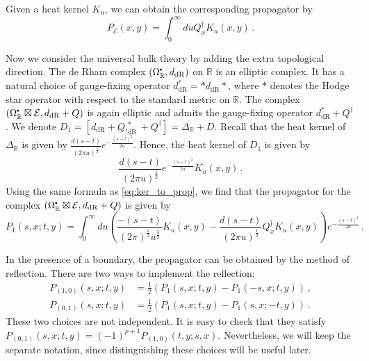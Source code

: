\documentclass[11pt]{article}
\newcommand{\R}{\mathbb{R}}
\newcommand{\derham}{\mathrm{dR}}
\newcommand\sbullet[1][.5]{\mathbin{\vcenter{\hbox{\scalebox{#1}{$\bullet$}}}}}
\numberwithin{equation}{section}
\begin{document}
Given a heat kernel $K_u$, we can obtain the corresponding propagator by
\begin{equation}\label{eq:ker_to_prop}
	P_{\mathcal{E}}(x,y) = \int_0^\infty du Q_x^{\dagger}K_u(x,y)\,.
\end{equation}

Now we consider the universal bulk theory by adding the extra topological direction. The de Rham complex $(\Omega^{\sbullet}_{\R},d_{\derham})$ on $\R$ is an elliptic complex. It has a natural choice of gauge-fixing operator $d_{\mathrm{dR}}^* = * d_{\mathrm{dR}}*$, where $*$ denotes the Hodge star operator with respect to the standard metric on $\R$. The complex $(\Omega^{\sbullet}_{\R}\boxtimes \mathcal{E}, d_{\mathrm{dR}}+Q)$ is again elliptic and admits the gauge-fixing operator $d_{\mathrm{dR}}^*+Q^{\dagger}$. We denote $D_1 = [d_\derham + Q,_{\derham}^* + Q^{\dagger}] =  \Delta_\R + D$. Recall that the heat kernel of $\Delta_\R$ is given by $\frac{d(s-t)}{(2\pi u)^{\frac{1}{2}}}e^{-\frac{(s-t)^2}{2u}}$. Hence, the heat kernel of $D_1$ is given by
\begin{equation}
	\frac{d(s-t)}{(2\pi u)^{\frac{1}{2}}}e^{-\frac{(s-t)^2}{2u}}K_u(x,y)\,.
\end{equation}
Using the same formula as \eqref{eq:ker_to_prop}, we find that the propagator for the complex $(\Omega^{\sbullet}_{\R}\boxtimes \mathcal{E}, d_{\mathrm{dR}}+Q)$ is given by
\begin{equation}\label{eq:Prop_R1}
	P_1(s,x;t,y) = \int_0^\infty du \left( \frac{-(s-t)}{(2\pi)^{\frac{1}{2}}u^{\frac{3}{2}}}K_u(x,y) - \frac{d(s-t)}{(2\pi u)^{\frac{1}{2}}}Q_x^{\dagger}K_u(x,y) \right)e^{-\frac{(s-t)^2}{2u}}\,.
\end{equation}

In the presence of a boundary, the propagator can be obtained by the method of reflection. There are two ways to implement the reflection:
\begin{equation}
\begin{aligned}
P_{(1,0)}(s,x;t,y) &= \frac{1}{2}\left(P_1(s,x;t,y) - P_1(-s,x;t,y)\right)\,,\\
P_{(0,1)}(s,x;t,y) &= \frac{1}{2}\left(P_1(s,x;t,y) - P_1(s,x;-t,y)\right)\,.
\end{aligned}
\end{equation}
These two choices are not independent. It is easy to check that they satisfy $P_{(0,1)}(s,x;t,y)=(-1)^{p+1}P_{(1,0)}(t,y;s,x)$. Nevertheless, we will keep the separate notation, since distinguishing these choices will be useful later.
\end{document}
